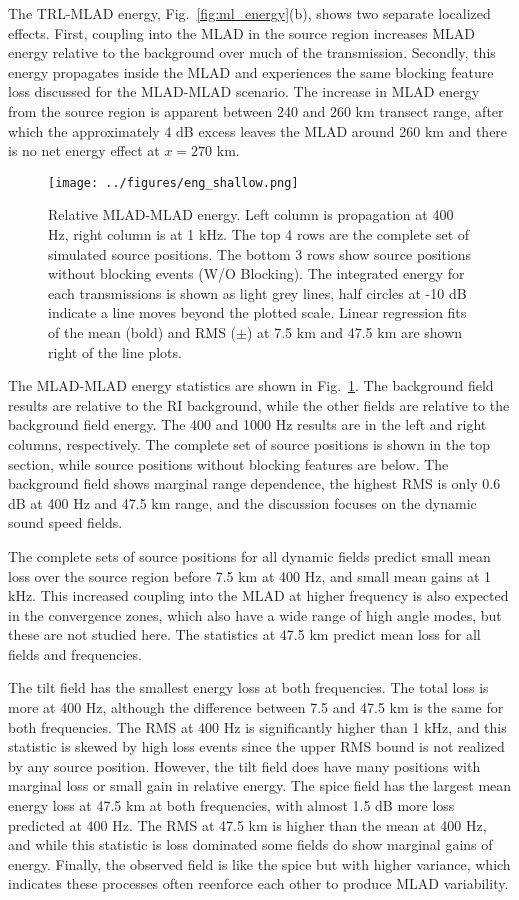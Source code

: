 \documentclass[preprint,NumberedRefs]{JASA}
\begin{document}
The TRL-MLAD energy, Fig.~\ref{fig:ml_energy}(b), shows two separate localized effects. First, coupling into the MLAD in the source region increases MLAD energy relative to the background over much of the transmission. Secondly, this energy propagates inside the MLAD and experiences the same blocking feature loss discussed for the MLAD-MLAD scenario. The increase in MLAD energy from the source region is apparent between 240 and 260 km transect range, after which the approximately 4 dB excess leaves the MLAD around 260 km and there is no net energy effect at $x=270$ km.

\begin{figure}
\texttt{[image: ../figures/eng\_shallow.png]}
    \caption{Relative MLAD-MLAD energy. Left column is propagation at 400 Hz, right column is at 1 kHz. The top 4 rows are the complete set of simulated source positions. The bottom 3 rows show source positions without blocking events (W/O Blocking). The integrated energy for each transmissions is shown as light grey lines, half circles at -10 dB indicate a line moves beyond the plotted scale. Linear regression fits of the mean (bold) and RMS ($\pm$) at 7.5 km and 47.5 km are shown right of the line plots.}
    \label{fig:shal_eng}
\end{figure}
The MLAD-MLAD energy statistics are shown in Fig.~\ref{fig:shal_eng}. The background field results are relative to the RI background, while the other fields are relative to the background field energy. The 400 and 1000 Hz results are in the left and right columns, respectively. The complete set of source positions is shown in the top section, while source positions without blocking features are below. The background field shows marginal range dependence, the highest RMS is only 0.6 dB at 400 Hz and 47.5 km range, and the discussion focuses on the dynamic sound speed fields.

The complete sets of source positions for all dynamic fields predict small mean loss over the source region before 7.5 km at 400 Hz, and small mean gains at 1 kHz. This increased coupling into the MLAD at higher frequency is also expected in the convergence zones, which also have a wide range of high angle modes, but these are not studied here. The statistics at 47.5 km predict mean loss for all fields and frequencies.

The tilt field has the smallest energy loss at both frequencies. The total loss is more at 400 Hz, although the difference between 7.5 and 47.5 km is the same for both frequencies. The RMS at 400 Hz is significantly higher than 1 kHz, and this statistic is skewed by high loss events since the upper RMS bound is not realized by any source position. However, the tilt field does have many positions with marginal loss or small gain in relative energy. The spice field has the largest mean energy loss at 47.5 km at both frequencies, with almost 1.5 dB more loss predicted at 400 Hz. The RMS at 47.5 km is higher than the mean at 400 Hz, and while this statistic is loss dominated some fields do show marginal gains of energy. Finally, the observed field is like the spice but with higher variance, which indicates these processes often reenforce each other to produce MLAD variability.
\end{document}
